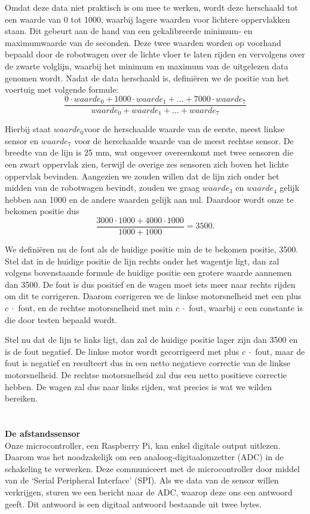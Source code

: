 \documentclass[a4paper,kulak]{kulakarticle}
\begin{document}
Omdat deze data niet praktisch is om mee te werken, wordt deze herschaald tot een waarde van 0 tot 1000, waarbij lagere waarden voor lichtere oppervlakken staan. Dit gebeurt aan de hand van een gekalibreerde minimum- en maximumwaarde van de seconden. Deze twee waarden worden op voorhand bepaald door de robotwagen over de lichte vloer te laten rijden en vervolgens over de zwarte volglijn, waarbij het minimum en maximum van de uitgelezen data genomen wordt. 
Nadat de data herschaald is, definiëren we de positie van het voertuig met volgende formule:
\begin{equation*}
	\frac{0\cdot waarde_{0} + 1000\cdot waarde_{1}+ ...+ 7000\cdot waarde_{7}} {waarde_{0} + waarde_{1} + ... + waarde_{7}}
\end{equation*}

Hierbij staat $waarde_{0} $voor de herschaalde waarde van de eerste, meest linkse sensor en $waarde_{7}$ voor de herschaalde waarde van de meest rechtse sensor. De breedte van de lijn is 25 mm, wat ongeveer overeenkomt met twee sensoren die een zwart oppervlak zien, terwijl de overige zes sensoren zich boven het lichte oppervlak bevinden. Aangezien we zouden willen dat de lijn zich onder het midden van de robotwagen bevindt, zouden we graag $waarde_{3}$ en $waarde_{4}$ gelijk hebben aan 1000 en de andere waarden gelijk aan nul. Daardoor wordt onze te bekomen positie dus\begin{equation*} \frac{3000\cdot1000+4000\cdot1000}{1000+1000} = 3500.\end{equation*}

We definiëren nu de fout als de huidige positie min de te bekomen positie, 3500. Stel dat in de huidige positie de lijn rechts onder het wagentje ligt, dan zal volgens bovenstaande formule de huidige positie een grotere waarde aannemen dan 3500. De fout is dus positief en de wagen moet iets meer naar rechts rijden om dit te corrigeren. Daarom corrigeren we de linkse motorsnelheid met een plus $c \ \cdot$ fout, en de rechtse motorsnelheid met min $c \ \cdot$ fout, waarbij c een constante is die door testen bepaald wordt. 

Stel nu dat de lijn te links ligt, dan zal de huidige positie lager zijn dan 3500 en is de fout negatief. De linkse motor wordt gecorrigeerd met plus $c \  \cdot$ fout, maar de fout is negatief en resulteert dus in een netto negatieve correctie van de linkse motorsnelheid. De rechtse motorsnelheid zal dus een netto positieve correctie hebben. De wagen zal dus naar links rijden, wat precies is wat we wilden bereiken. \\ \\
\\
\textbf{\large De afstandssensor}\
\\
Onze microcontroller, een Raspberry Pi, kan enkel digitale output uitlezen. Daarom was het noodzakelijk om een analoog-digitaalomzetter (ADC) in de schakeling te verwerken. Deze communiceert met de microcontroller door middel van de `Serial Peripheral Interface' (SPI). Als we data van de sensor willen verkrijgen, sturen we een bericht naar de ADC, waarop deze ons een antwoord geeft. Dit antwoord is een digitaal antwoord bestaande uit twee bytes. 
\end{document}
